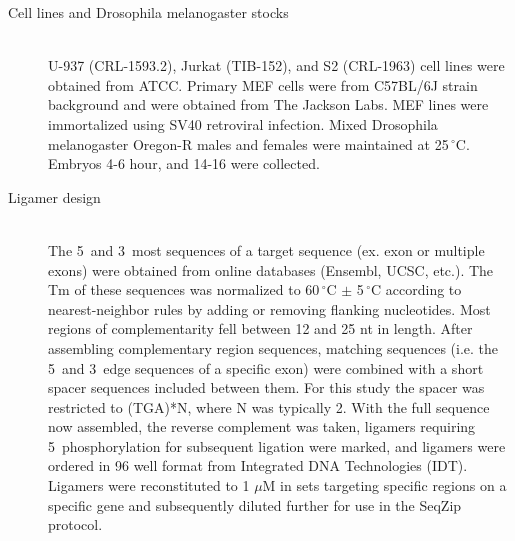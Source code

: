   \begin{description}
  	\item[Cell lines and Drosophila melanogaster stocks] \hfill \\
		
		U-937 (CRL-1593.2), Jurkat (TIB-152), and S2 (CRL-1963) cell lines were obtained from ATCC. Primary MEF cells were from C57BL/6J strain background and were obtained from The Jackson Labs. MEF lines were immortalized using SV40 retroviral infection. Mixed Drosophila melanogaster Oregon-R males and females were maintained at 25$\,^{\circ}\mathrm{C}$. Embryos 4-6 hour, and 14-16 were collected. 

		\item[Ligamer design] \hfill \\
		The 5\textprime~and 3\textprime~most sequences of a target sequence (ex. exon or multiple exons) were obtained from online databases (Ensembl, UCSC, etc.). The Tm of these sequences was normalized to 60$\,^{\circ}\mathrm{C}$ $\pm$ 5$\,^{\circ}\mathrm{C}$ according to nearest-neighbor rules \citep{Xia1998} by adding or removing flanking nucleotides. Most regions of complementarity fell between 12 and 25 nt in length. After assembling complementary region sequences, matching sequences (i.e. the 5\textprime~and 3\textprime~edge sequences of a specific exon) were combined with a short spacer sequences included between them. For this study the spacer was restricted to (TGA)*N, where N was typically 2. With the full sequence now assembled, the reverse complement was taken, ligamers requiring 5\textprime~phosphorylation for subsequent ligation were marked, and ligamers were ordered in 96 well format from Integrated DNA Technologies (IDT). Ligamers were reconstituted to 1 $\mu$M in sets targeting specific regions on a specific gene and subsequently diluted further for use in the SeqZip protocol.


\end{description}
